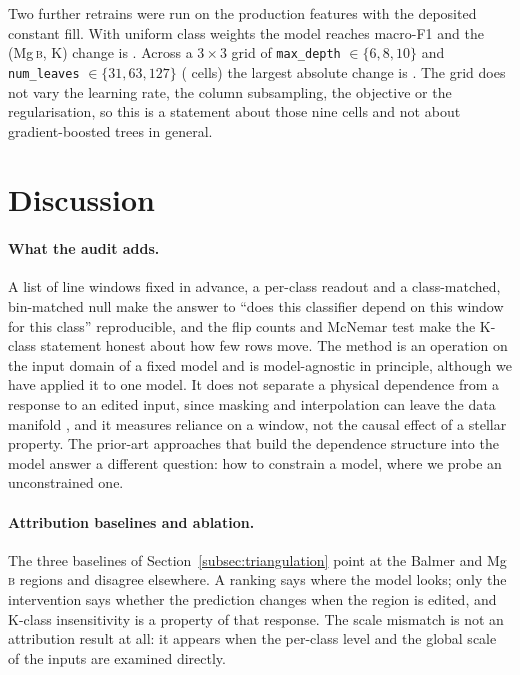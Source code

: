 \documentclass[11pt,a4paper]{article}
\newcommand{\Mgb}{Mg\,\textsc{b}\xspace}
\begin{document}
Two further retrains were run on the production features with the deposited constant fill. With uniform class weights the model reaches macro-F1 \uwMacroF{} and the (\Mgb, K) change is \uwDelta. Across a $3 \times 3$ grid of \texttt{max\_depth} $\in \{6, 8, 10\}$ and \texttt{num\_leaves} $\in \{31, 63, 127\}$ (\gridNCells{} cells) the largest absolute change is \gridMaxDelta. The grid does not vary the learning rate, the column subsampling, the objective or the regularisation, so this is a statement about those nine cells and not about gradient-boosted trees in general.

\section{Discussion}
\label{sec:discussion}

\paragraph{What the audit adds.} A list of line windows fixed in advance, a per-class readout and a class-matched, bin-matched null make the answer to ``does this classifier depend on this window for this class'' reproducible, and the flip counts and McNemar test make the K-class statement honest about how few rows move. The method is an operation on the input domain of a fixed model and is model-agnostic in principle, although we have applied it to one model. It does not separate a physical dependence from a response to an edited input, since masking and interpolation can leave the data manifold \citep{Hooker2019Benchmark,Covert2021Removing}, and it measures reliance on a window, not the causal effect of a stellar property. The prior-art approaches that build the dependence structure into the model \citep{2019ApJ...879...69T,2019ApJS..245...34X,2019MNRAS.483.3255L} answer a different question: how to constrain a model, where we probe an unconstrained one.

\paragraph{Attribution baselines and ablation.} The three baselines of Section~\ref{subsec:triangulation} point at the Balmer and \Mgb regions and disagree elsewhere. A ranking says where the model looks; only the intervention says whether the prediction changes when the region is edited, and K-class insensitivity is a property of that response. The scale mismatch is not an attribution result at all: it appears when the per-class level and the global scale of the inputs are examined directly.
\end{document}
